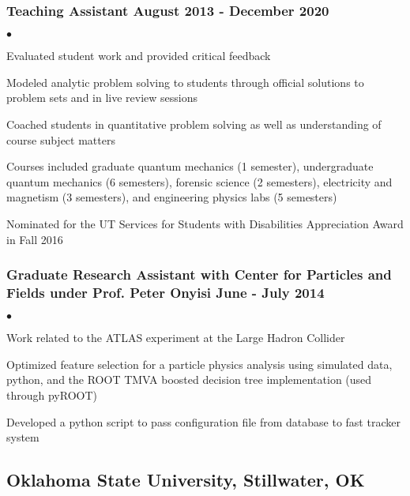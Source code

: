 \documentclass[letterpaper]{article}
\renewenvironment{itemize}{
  \begin{list}{$\bullet$}{
    \setlength{\itemsep}{0em}
    \setlength{\parskip}{0em}
    \setlength{\parsep}{0em} 
    \setlength{\topsep}{0em} 
  }
}{
  \end{list}
}
\begin{document}
\subsubsection*{Teaching Assistant \hfill August 2013 - December 2020}
    \begin{itemize}
    
        \item Evaluated student work and provided critical feedback
        \item Modeled analytic problem solving to students through official solutions to problem sets and in live review sessions
        \item Coached students in quantitative problem solving as well as understanding of course subject matters
        \item Courses included graduate quantum mechanics (1 semester), undergraduate quantum mechanics (6 semesters), forensic science (2 semesters), electricity and magnetism (3 semesters), and engineering physics labs (5 semesters)
        \item Nominated for the UT Services for Students with Disabilities Appreciation Award in Fall 2016
    \end{itemize}
    
\subsubsection*{Graduate Research Assistant with Center for Particles and Fields under Prof. Peter Onyisi \hfill June - July 2014}
    \begin{itemize}
        
        \item Work related to the ATLAS experiment at the Large Hadron Collider
        \item Optimized feature selection for a particle physics analysis using simulated data, python, and the ROOT TMVA boosted decision tree implementation (used through pyROOT)
        \item Developed a python script to pass configuration file from database to fast tracker system
        
    \end{itemize}

\subsection*{Oklahoma State University, Stillwater, OK}
\end{document}
